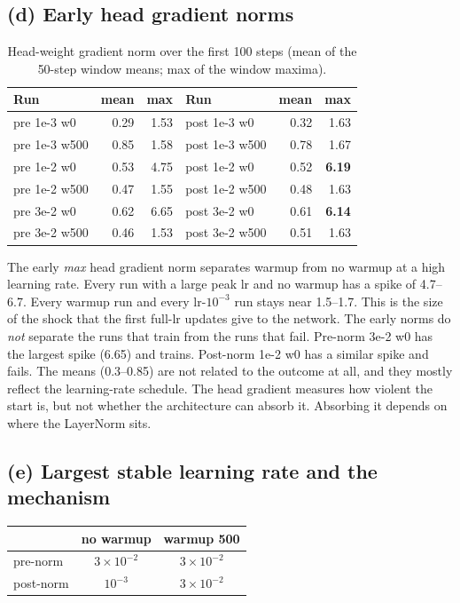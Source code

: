\documentclass[11pt]{article}
\begin{document}
\subsection*{(d) Early head gradient norms}

\begin{table}[H]\centering
\begin{tabular}{lrr|lrr}\toprule
Run & mean & max & Run & mean & max\\\midrule
pre 1e-3 w0 & 0.29 & 1.53 & post 1e-3 w0 & 0.32 & 1.63\\
pre 1e-3 w500 & 0.85 & 1.58 & post 1e-3 w500 & 0.78 & 1.67\\
pre 1e-2 w0 & 0.53 & 4.75 & post 1e-2 w0 & 0.52 & \textbf{6.19}\\
pre 1e-2 w500 & 0.47 & 1.55 & post 1e-2 w500 & 0.48 & 1.63\\
pre 3e-2 w0 & 0.62 & 6.65 & post 3e-2 w0 & 0.61 & \textbf{6.14}\\
pre 3e-2 w500 & 0.46 & 1.53 & post 3e-2 w500 & 0.51 & 1.63\\\bottomrule
\end{tabular}
\caption{Head-weight gradient norm over the first 100 steps (mean of the 50-step window means; max of the window maxima).}
\end{table}

The early \emph{max} head gradient norm separates warmup from no warmup at a
high learning rate. Every run with a large peak lr and no warmup has a spike of 4.7--6.7.
Every warmup run and every lr-$10^{-3}$ run stays near 1.5--1.7. This is the size of
the shock that the first full-lr updates give to the network. The early norms do \emph{not}
separate the runs that train from the runs that fail. Pre-norm 3e-2 w0 has the largest spike (6.65)
and trains. Post-norm 1e-2 w0 has a similar spike and fails. The means (0.3--0.85) are not
related to the outcome at all, and they mostly reflect the learning-rate schedule. The
head gradient measures how violent the start is, but not whether the
architecture can absorb it. Absorbing it depends on where the LayerNorm sits.

\subsection*{(e) Largest stable learning rate and the mechanism}

\begin{table}[H]\centering
\begin{tabular}{lcc}\toprule
& no warmup & warmup 500\\\midrule
pre-norm  & $3\times10^{-2}$ & $3\times10^{-2}$\\
post-norm & $10^{-3}$ & $3\times10^{-2}$\\\bottomrule
\end{tabular}\end{table}
\end{document}
